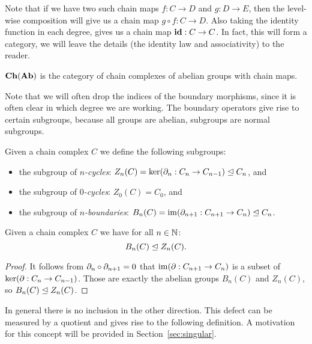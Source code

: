Note that if we have two such chain maps $f:C \to D$ and $g:D \to E$, then the level-wise composition will give us a chain map $g \circ f: C \to D$. Also taking the identity function in each degree, gives us a chain map $\mathbf{id} : C \to C$. In fact, this will form a category, we will leave the details (the identity law and associativity) to the reader.

\begin{definition}
	$\mathbf{Ch}(\mathbf{Ab})$ is the category of chain complexes of abelian groups with chain maps.
\end{definition}

Note that we will often drop the indices of the boundary morphisms, since it is often clear in which degree we are working. The boundary operators give rise to certain subgroups, because all groups are abelian, subgroups are normal subgroups.

\begin{definition}
	\label{def:cycles}
	Given a chain complex $C$ we define the following subgroups:
	\begin{itemize}
		\item the subgroup of \emph{$n$-cycles}: $Z_n(C) = \ker(\partial_n: C_n \to C_{n-1}) \trianglelefteq C_n$, and
		\item the subgroup of \emph{$0$-cycles}: $Z_0(C) = C_0$, and
		\item the subgroup of \emph{$n$-boundaries}: $B_n(C) = \operatorname{im}(\partial_{n+1}: C_{n+1} \to C_n) \trianglelefteq C_n$.
	\end{itemize}
\end{definition}
\begin{lemma}
	Given a chain complex $C$ we have for all $n \in \mathbb{N}$:
	$$ B_n(C) \trianglelefteq Z_n(C).$$
\end{lemma}
\begin{proof}
	It follows from $\partial_n \circ \partial_{n+1} = 0$ that $\operatorname{im}(\partial: C_{n+1} \to C_n)$ is a subset of $\ker(\partial: C_n \to C_{n-1})$. Those are exactly the abelian groups $B_n(C)$ and $Z_n(C)$, so $ B_n(C) \trianglelefteq Z_n(C) $.
\end{proof}

In general there is no inclusion in the other direction. This defect can be measured by a quotient and gives rise to the following definition. A motivation for this concept will be provided in Section~\ref{sec:singular}.

